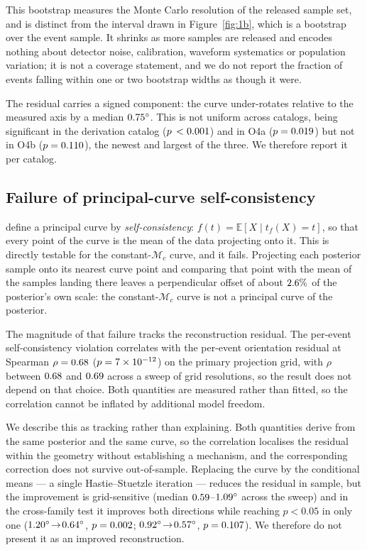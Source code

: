 \documentclass[aps,preprint,amsmath,amssymb,nofootinbib,superscriptaddress]{revtex4-2}
\begin{document}
This bootstrap measures the Monte Carlo resolution of the released sample set, and is distinct from the
interval drawn in Figure~\ref{fig:1b}, which is a bootstrap over the event sample. It shrinks as more samples
are released and encodes nothing about detector noise, calibration, waveform systematics or population
variation; it is not a coverage statement, and we do not report the fraction of events falling within one
or two bootstrap widths as though it were.

The residual carries a signed component: the curve under-rotates relative to the measured axis by a median
$0.75^\circ$. This is not uniform across catalogs, being significant in the derivation catalog
($p\,<0.001$) and in O4a ($p=0.019$) but not in O4b ($p=0.110$), the newest and largest
of the three. We therefore report it per catalog.

\subsection{Failure of principal-curve self-consistency}
\label{sec:selfcons}
\citet{HastieStuetzle1989} define a principal curve by \emph{self-consistency}: $f(t) = \mathbb{E}[X \mid
t_f(X) = t]$, so that every point of the curve is the mean of the data projecting onto it. This is directly
testable for the constant-$\mathcal{M}_c$ curve, and it fails. Projecting each posterior sample onto its
nearest curve point and comparing that point with the mean of the samples landing there leaves a
perpendicular offset of about $2.6\%$ of the posterior's own scale: the constant-$\mathcal{M}_c$
curve is not a principal curve of the posterior.

The magnitude of that failure tracks the reconstruction residual. The per-event self-consistency violation
correlates with the per-event orientation residual at Spearman $\rho=0.68$ ($p=7\times10^{-12}$) on the primary
projection grid, with $\rho$ between $0.68$ and $0.69$ across a sweep of grid resolutions, so
the result does not depend on that choice. Both quantities are measured rather than fitted, so the
correlation cannot be inflated by additional model freedom.

We describe this as tracking rather than explaining. Both quantities derive from the same posterior and the
same curve, so the correlation localises the residual within the geometry without establishing a mechanism,
and the corresponding correction does not survive out-of-sample. Replacing the curve by the conditional
means --- a single Hastie--Stuetzle iteration --- reduces the residual in sample, but the improvement is
grid-sensitive (median $0.59$--$1.09^\circ$ across the sweep) and in the cross-family test
it improves both directions while reaching $p<0.05$ in only one
($1.20^\circ\!\to\!0.64^\circ$, $p=0.002$;
$0.92^\circ\!\to\!0.57^\circ$, $p=0.107$). We therefore do not present it as an
improved reconstruction.
\end{document}
